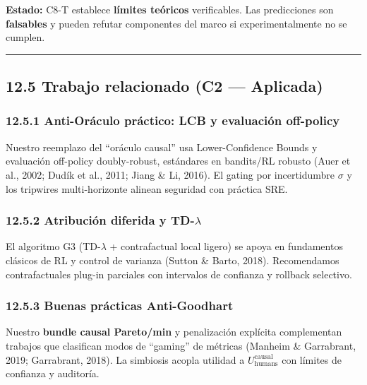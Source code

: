\textbf{Estado:} C8-T establece \textbf{límites teóricos} verificables.
Las predicciones son \textbf{falsables} y pueden refutar componentes del
marco si experimentalmente no se cumplen.

\begin{center}\rule{0.5\linewidth}{0.5pt}\end{center}

\subsection{12.5 Trabajo relacionado (C2 ---
Aplicada)}\label{trabajo-relacionado-c2-aplicada}

\subsubsection{12.5.1 Anti-Oráculo práctico: LCB y evaluación
off-policy}\label{anti-oruxe1culo-pruxe1ctico-lcb-y-evaluaciuxf3n-off-policy}

Nuestro reemplazo del ``oráculo causal'' usa Lower-Confidence Bounds y
evaluación off-policy doubly-robust, estándares en bandits/RL robusto
(Auer et al., 2002; Dudík et al., 2011; Jiang \& Li, 2016). El gating
por incertidumbre \(\sigma\) y los tripwires multi-horizonte alinean
seguridad con práctica SRE.

\subsubsection{\texorpdfstring{12.5.2 Atribución diferida y
TD-\(\lambda\)}{12.5.2 Atribución diferida y TD-\textbackslash lambda}}\label{atribuciuxf3n-diferida-y-td-lambda}

El algoritmo G3 (TD-\(\lambda\) + contrafactual local ligero) se apoya
en fundamentos clásicos de RL y control de varianza (Sutton \& Barto,
2018). Recomendamos contrafactuales plug-in parciales con intervalos de
confianza y rollback selectivo.

\subsubsection{12.5.3 Buenas prácticas
Anti-Goodhart}\label{buenas-pruxe1cticas-anti-goodhart}

Nuestro \textbf{bundle causal Pareto/min} y penalización explícita
complementan trabajos que clasifican modos de ``gaming'' de métricas
(Manheim \& Garrabrant, 2019; Garrabrant, 2018). La simbiosis acopla
utilidad a \(U_{\text{humans}}^{\text{causal}}\) con límites de
confianza y auditoría.

